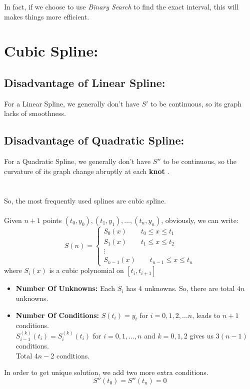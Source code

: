 \documentclass [9 pt]{article}
\theoremstyle{definition}
\begin{document}
In fact, if we choose to use \textit{ Binary Search } to find the exact interval, this will makes things more efficient. 

\newpage

\section*{Cubic Spline:}
\subsection*{Disadvantage of Linear Spline:}
For a Linear Spline, we generally don't have $S'$ to be continuous, so its graph lacks of smoothness.

\subsection*{Disadvantage of Quadratic Spline:}
For a Quadratic Spline, we generally don't have $S''$ to be continuous, so the curvature of its graph change abruptly at each \textbf{ knot }.
\\
\\
\\
So, the most frequently used splines are cubic spline.\\
\\
Given $n + 1$ points $(t_0, y_0), (t_1, y_1), \ldots, (t_n, y_n)$, obviously, we can write:
$$
S(n) = 
\begin{cases}
	S_0(x) \quad \quad t_0 \leq x \leq t_1\\
	S_1(x) \quad \quad t_1 \leq x \leq t_2\\
	\vdots\\
	S_{n - 1}(x) \quad\quad t_{n - 1} \leq x \leq t_n
\end{cases}
$$
where $S_i(x)$ is a cubic polynomial on $[t_i, t_{i+1}]$
\begin{itemize}
	\item \textbf{ Number Of Unknowns:}  Each $S_i$ has 4 unknowns. So, there are total $4n$ unknowns.
	\item \textbf{ Number Of Conditions:} $S(t_i) = y_i $ for $i = 0, 1, 2, \ldots n$, leads to $n + 1$ conditions.\\
	 $S_{i - 1}^{(k)}(t_i) = S_i^{(k)}(t_i)$ for $i = 0, 1, \ldots , n$ and $k = 0, 1 ,2$ gives us $3(n - 1)$ conditions.\\
	 Total $4n - 2$ conditions.
\end{itemize}

In order to get unique solution, we add two more extra conditions.
$$ S''(t_0) = S''(t_n) = 0 $$
\end{document}
